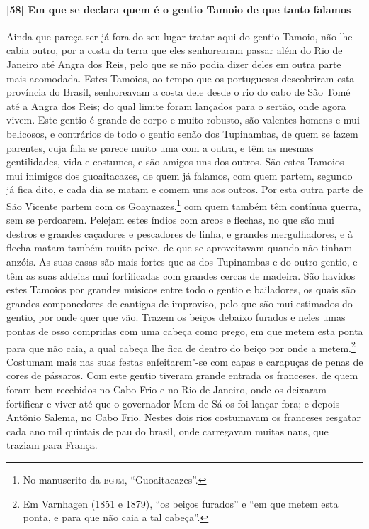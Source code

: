 \begin{linenumbers}
\paragraph{[58] Em que se declara quem é o gentio Tamoio de que tanto falamos} \quad
Ainda que pareça ser já fora do seu lugar tratar aqui do gentio Tamoio, não lhe cabia
outro, por a costa da terra que eles senhorearam passar além do Rio de Janeiro até Angra
dos Reis, pelo que se não podia dizer deles em outra parte mais acomodada. Estes Tamoios,
ao tempo que os portugueses descobriram esta província do Brasil, senhoreavam a costa dele
desde o rio do cabo de São Tomé até a Angra dos Reis; do qual limite foram lançados para o
sertão, onde agora vivem. Este gentio é grande de corpo e muito robusto, são valentes
homens e mui belicosos, e contrários de todo o gentio senão dos Tupinambas, de quem se
fazem parentes, cuja fala se parece muito uma com a outra, e têm as mesmas gentilidades,
vida e costumes, e são amigos uns dos outros. São estes Tamoios mui inimigos dos
guoaitacazes, de quem já falamos, com quem partem, segundo já fica dito, e cada dia se
matam e comem uns aos outros. Por esta outra parte de São Vicente partem com os
Goaynazes,\footnote{ No manuscrito da \textsc{bgjm}, ``Guoaitacazes''.} com quem também
têm contínua guerra, sem se perdoarem. Pelejam estes índios com arcos e flechas, no que
são mui destros e grandes caçadores e pescadores de linha, e grandes mergulhadores, e à
flecha matam também muito peixe, de que se aproveitavam quando não tinham anzóis. As suas
casas são mais fortes que as dos Tupinambas e do outro gentio, e têm as suas aldeias mui
fortificadas com grandes cercas de madeira. São havidos estes Tamoios por grandes músicos
entre todo o gentio e bailadores, os quais são grandes componedores de cantigas de
improviso, pelo que são mui estimados do gentio, por onde quer que vão. Trazem os beiços
debaixo furados e neles umas pontas de osso compridas com uma cabeça como prego, em que
metem esta ponta para que não caia, a qual cabeça lhe fica de dentro do beiço por onde a
metem.\footnote{ Em Varnhagen (1851 e 1879), ``os beiços furados'' e ``em que metem esta
ponta, e para que não caia a tal cabeça''.} Costumam mais nas suas festas enfeitarem"-se
com capas e carapuças de penas de cores de pássaros. Com este gentio tiveram grande
entrada os franceses, de quem foram bem recebidos no Cabo Frio e no Rio de Janeiro, onde
os deixaram fortificar e viver até que o governador Mem de Sá os foi lançar fora; e depois
Antônio Salema, no Cabo Frio. Nestes dois rios costumavam os franceses resgatar cada ano
mil quintais de pau do brasil, onde carregavam muitas naus, que traziam para França.


\end{linenumbers}
